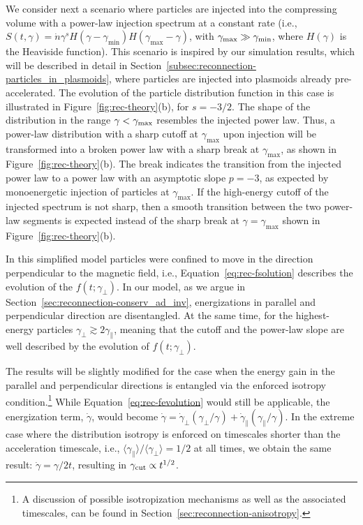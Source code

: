 
We consider next a scenario where particles are injected into the compressing volume with a power-law injection spectrum at a constant rate (i.e., $S(t, \gamma)=\dot{n}\gamma^{s} H(\gamma - \gamma_{\min})H(\gamma_{\max}-\gamma)$, with $\gamma_{\rm max}\gg \gamma_{\rm min}$, where $H(\gamma)$ is the Heaviside function). This scenario is inspired by our simulation results, which will be described in detail in Section~\ref{subsec:reconnection-particles_in_plasmoids}, where particles are injected into plasmoids already pre-accelerated. The evolution of the particle distribution function in this case is illustrated in Figure~\ref{fig:rec-theory}(b), for $s=-3/2$. The shape of the distribution in the range $\gamma < \gamma_{\rm max}$ resembles the injected power law. Thus, a power-law distribution with a sharp cutoff at $\gamma_{\max}$ upon injection will be transformed into a broken power law with a sharp break at $\gamma_{\max}$, as shown in Figure~\ref{fig:rec-theory}(b). The break indicates the transition from the injected power law to a power law with an asymptotic slope $p=-3$, as expected by monoenergetic injection of particles at $\gamma_{\max}$. If the high-energy cutoff of the injected spectrum is not sharp, then a smooth transition between the two power-law segments is expected instead of the sharp break at $\gamma=\gamma_{\max}$ shown in Figure~\ref{fig:rec-theory}(b).

In this simplified model particles were confined to move in the direction perpendicular to the magnetic field, i.e., Equation~\eqref{eq:rec-fsolution} describes the evolution of the $f(t;\gamma_{\perp})$. In our model, as we argue in Section~\ref{sec:reconnection-conserv_ad_inv}, energizations in parallel and perpendicular direction are disentangled. At the same time, for the highest-energy particles $\gamma_{\perp} \gtrsim 2\gamma_\parallel$, meaning that the cutoff and the power-law slope are well described by the evolution of $f(t;\gamma_{\perp})$.

The results will be slightly modified for the case when the energy gain in the parallel and perpendicular directions is entangled via the enforced isotropy condition.\footnote{A discussion of possible isotropization mechanisms as well as the associated timescales, can be found in Section~\ref{sec:reconnection-anisotropy}.} While Equation~\eqref{eq:rec-fevolution} would still be applicable, the energization term, $\dot{\gamma}$, would become $\dot{\gamma} = \dot{\gamma}_{\perp} (\gamma_\perp/\gamma)+\dot{\gamma}_{\parallel} (\gamma_\parallel/\gamma)$. In the extreme case where the distribution isotropy is enforced on timescales shorter than the acceleration timescale, i.e., $\langle\gamma_\parallel\rangle/\langle\gamma_\perp\rangle=1/2$ at all times, we obtain the same result: $\dot {\gamma} = \gamma / 2 t$, resulting in $\gamma_{\rm cut}\propto t^{1/2}$. 

